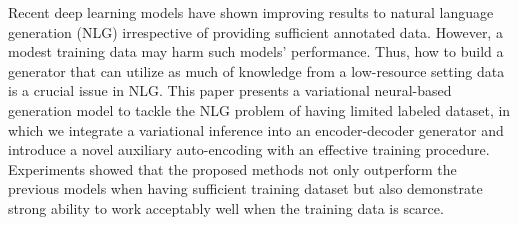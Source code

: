Recent deep learning models have shown improving results to natural language generation (NLG) irrespective of providing sufficient annotated data. However, a modest training data may harm such models' performance. Thus, how to build a generator that can utilize as much of knowledge from a low-resource setting data is a crucial issue in NLG. This paper presents a variational neural-based generation model to tackle the NLG problem of having limited labeled dataset, in which we integrate a variational inference into an encoder-decoder generator and introduce a novel auxiliary auto-encoding with an effective training procedure. Experiments showed that the proposed methods not only outperform the previous models when having sufficient training dataset but also demonstrate strong ability to work acceptably well when the training data is scarce.
